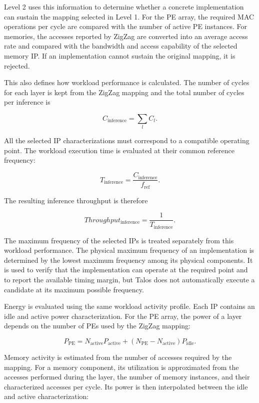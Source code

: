 Level 2 uses this information to determine whether a concrete
implementation can sustain the mapping selected in Level 1. For the
PE array, the required MAC operations per cycle are compared with the
number of active PE instances.
For memories, the
accesses reported by ZigZag are converted into an average access rate
and compared with the bandwidth and access capability of the selected
memory IP. If an implementation cannot sustain the original mapping,
it is rejected.

This also defines how workload performance is calculated. The number
of cycles for each layer is kept from the ZigZag mapping and the total
number of cycles per inference is

\[
C_{\mathrm{inference}} =
\sum_l C_l.
\]

All the selected IP characterizations must correspond to a compatible
operating point. The workload execution time is evaluated at their
common reference frequency:

\[
T_{\mathrm{inference}} =
\frac{C_{\mathrm{inference}}}
     {f_{\mathrm{ref}}}.
\]

The resulting inference throughput is therefore

\[
Throughput_{\mathrm{inference}} =
\frac{1}{T_{\mathrm{inference}}}.
\]

The maximum frequency of the selected IPs is treated separately from
this workload performance. The physical maximum frequency of an
implementation is determined by the lowest maximum frequency among
its physical components. It is used to verify that the implementation
can operate at the required point and to report the available timing
margin, but Talos does not automatically execute a candidate at its
maximum possible frequency.

Energy is evaluated using the same workload activity profile. Each IP
contains an idle and active power characterization. For the PE array,
the power of a layer depends on the number of PEs used by the ZigZag
mapping:

\[
P_{\mathrm{PE}} =
N_{\mathrm{active}} P_{\mathrm{active}} +
(N_{\mathrm{PE}}-N_{\mathrm{active}})
P_{\mathrm{idle}}.
\]

Memory activity is estimated from the number of accesses required by
the mapping. For a memory component, its utilization is approximated
from the accesses performed during the layer, the number of memory
instances, and their characterized accesses per cycle. Its power is
then interpolated between the idle and active characterization:


